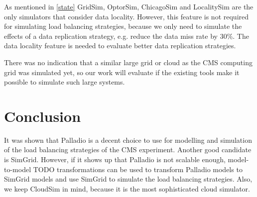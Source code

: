 As mentioned in \cref{state} GridSim, OptorSim, ChicagoSim and LocalitySim are the only simulators that consider data locality. However, this feature is not required for simulating load balancing strategies, because we only need to simulate the effects of a data replication strategy, e.g. reduce the data miss rate by 30\%. The data locality feature is needed to evaluate better data replication strategies. 

There was no indication that a similar large grid or cloud as the CMS computing grid was simulated yet, so our work will evaluate if the existing tools make it possible to simulate such large systems.


\begin{center}
\label{compare}
\end{center}

\chapter{Conclusion}

It was shown that Palladio is a decent choice to use for modelling and simulation of the load balancing strategies of the CMS experiment. Another good candidate is SimGrid. However, if it shows up that Palladio is not scalable enough, model-to-model TODO transformations can be used to transform Palladio models to SimGrid models and use SimGrid to simulate the load balancing strategies. Also, we keep CloudSim in mind, because it is the most sophisticated cloud simulator.


